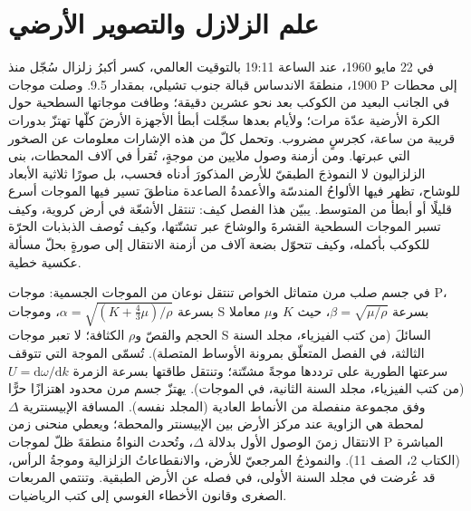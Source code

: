 \chapter{علم الزلازل والتصوير الأرضي}\label{ch:b3:seismology-imaging}

في 22 مايو 1960، عند الساعة 19:11 بالتوقيت العالمي، كسر أكبرُ زلزال سُجّل منذ
1900، منطقةَ الاندساس قبالة جنوب تشيلي، بمقدار 9.5.
وصلت موجات P إلى محطات في الجانب البعيد من الكوكب بعد نحو عشرين
دقيقة؛ وطافت موجاتها السطحية حول الكرة الأرضية عدّة مرات؛ ولأيام
بعدها سجّلت أبطأ الأجهزة الأرضَ كلّها تهتزّ
بدورات قريبة من ساعة، كجرسٍ مضروب. وتحمل كلّ من هذه الإشارات
معلومات عن الصخور التي عبرتها. ومن أزمنة وصول ملايين من
موجةٍ، تُقرأ في آلاف المحطات، بنى الزلزاليون لا النموذجَ
الطبقيّ للأرض المذكورَ أدناه فحسب، بل صورًا ثلاثية الأبعاد للوشاح،
تظهر فيها الألواحُ المندسّة والأعمدةُ الصاعدة مناطقَ
تسير فيها الموجات أسرع قليلًا أو أبطأ من المتوسط. يبيّن هذا الفصل كيف:
تنتقل الأشعّة في أرض كروية، وكيف تسبر الموجات السطحية القشرةَ
والوشاحَ عبر تشتّتها، وكيف تُوصف الذبذبات الحرّة للكوكب بأكمله،
وكيف تتحوّل بضعة آلاف من أزمنة الانتقال إلى
صورةٍ بحلّ مسألة عكسية خطية.

\begin{recall}
في جسم صلب مرن متماثل الخواص تنتقل نوعان من الموجات الجسمية: موجات P،
بسرعة $\alpha = \sqrt{(K + \tfrac43\mu)/\rho}$، وموجات S بسرعة
$\beta = \sqrt{\mu/\rho}$، حيث $K$ و$\mu$ معاملا الحجم والقصّ
و$\rho$ الكثافة؛ لا تعبر موجات S السائلَ (من كتب الفيزياء، مجلد السنة الثالثة،
في الفصل المتعلّق بمرونة الأوساط المتصلة). تُسمّى الموجة التي تتوقف سرعتها الطورية
على ترددها موجةً مشتّتة؛ وتنتقل طاقتها بسرعة الزمرة
$U = \mathrm d\omega/\mathrm dk$ (من كتب الفيزياء، مجلد السنة الثانية، في
الموجات). يهتزّ جسم مرن محدود اهتزازًا حرًّا وفق مجموعة منفصلة من الأنماط
العادية (المجلد نفسه). المسافة الإبيسنترية $\Delta$ لمحطة هي الزاوية
عند مركز الأرض بين الإبيسنتر والمحطة؛ ويعطي منحنى زمن الانتقال
زمنَ الوصول الأول بدلالة $\Delta$، وتُحدث النواةُ
منطقةَ ظلّ لموجات P المباشرة (الكتاب 2، الصف 11). والنموذجُ المرجعيّ للأرض،
والانقطاعاتُ الزلزالية وموجةُ الرأس، قد عُرضت في مجلد السنة الأولى،
في فصله عن الأرض الطبقية. وتنتمي المربعات الصغرى وقانون الأخطاء الغوسي
إلى كتب الرياضيات.
\end{recall}

